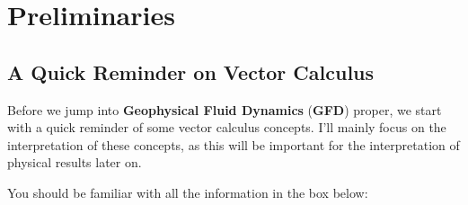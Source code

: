 \chapter{Preliminaries}\label{Prelim GFD}

\section{A Quick Reminder on Vector Calculus}

Before we jump into \textbf{Geophysical Fluid Dynamics} (\textbf{GFD}) proper, we start with a quick reminder of some vector calculus concepts. I'll mainly focus on the interpretation of these concepts, as this will be important for the interpretation of physical results later on.

You should be familiar with all the information in the box below:

